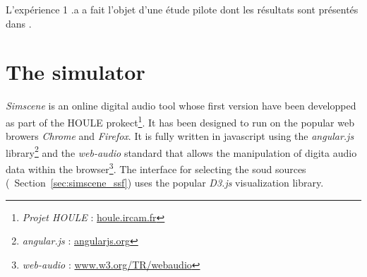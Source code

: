 \documentclass[twoside,twocolumn]{article}
\begin{document}

L'expérience 1 .a a fait l'objet d'une étude pilote dont les résultats sont présentés dans \cite{lafay2013atiam,lafay2014new}.



\section{The simulator}
\label{sec:simscene}


\emph{Simscene} is an online digital audio tool whose first version have been developped as part of the HOULE prokect\footnote{\emph{Projet HOULE} : \url{houle.ircam.fr}}. It has been designed to run on the popular web browers \emph{Chrome} and \emph{Firefox}. It is fully written in javascript using the \emph{angular.js} library\footnote{\emph{angular.js} : \url{angularjs.org}} and the \emph{web-audio} standard that allows the manipulation of digita audio data within the browser\footnote{\emph{web-audio} : \url{www.w3.org/TR/webaudio}}. The interface for selecting the soud sources (\cf~Section~\ref{sec:simscene_ssf}) uses the popular \emph{D3.js} \cite{d32011} visualization library.

\end{document}
